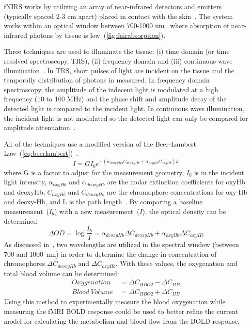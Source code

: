 fNIRS works by utilizing an array of near-infrared detectors and emitters (typically spaced 2-3 cm apart) placed in contact with the skin~\citep{villringer1997,izzetoglu2004}.  The system works within an optical window between 700-1000 nm~\citep{villringer1997} where absorption of near-infrared photons by tissue is low~(\cref{fig:fnirabsorption}).

Three techniques are used to illuminate the tissue: (i) time domain (or time resolved spectroscopy, TRS), (ii) frequency domain and (iii) continuous wave illumination~\citep{izzetoglu2004}.  In TRS, short pulses of light are incident on the tissue and the temporally distribution of photons in measured.  In frequency domain spectroscopy, the amplitude of the indecent light is modulated at a high frequency (10 to 100 MHz) and the phase shift and amplitude decay of the detected light is compared to the incident light. In continuous wave illumination, the incident light is not modulated so the detected light can only be compared for amplitude attenuation~\citep{izzetoglu2004}.

All of the techniques use a modified version of the Beer-Lambert Law~(\cref{eq:beerlambert})~\citep{cope}.  
\begin{equation}
  \label{eq:modifiedbeerlamber}
  I = G I_0 e^{-(\alpha_{deoxyHb}C_{deoxyHb}+\alpha_{oxyHb}C_{oxyHb})L} 
\end{equation}
where G is a factor to adjust for the measurement geometry, $I_0$ is in the incident light intensity, $\alpha_{oxyHb}$ and $\alpha_{deoxyHb}$ are the molar extinction coefficients for oxyHb and deoxyHb, $C_{oxyHb}$ and $C_{deoxyHb}$ are the chromophore concentrations for oxy-Hb and deoxy-Hb, and L is the path length~\citep{izzetoglu2004}.  By comparing a baseline measurement~($I_b$) with a new measurement~($I$), the optical density can be determined~\citep{izzetoglu2004}
\begin{equation}
  \Delta OD = \log \frac{I_b}{I} = \alpha_{deoxyHb} \Delta C_{deoxyHb}+\alpha_{oxyHb} \Delta C_{oxyHb}
\end{equation}
As discussed in~\citet{izzetoglu2004}, two wavelengths are utilized in the spectral window (between 700 and 1000~nm) in order to determine the change in concentration of chromophores $\Delta C_{deoxyHb}$ and $\Delta C_{oxyHb}$.  With these values, the oxygenation and total blood volume can be determined:
\begin{align}
  \label{eq:o2bloodvolume}
  Oxygenation\ &= \Delta C_{HBO2} - \Delta C_{HB} \nonumber \\
  Blood\ Volume\ &= \Delta C_{HBO2} + \Delta C_{HB} 
\end{align}
Using this method to experimentally measure the blood oxygenation while measuring the fMRI BOLD response could be used to better refine the current model for calculating the metabolism and blood flow from the BOLD response.
